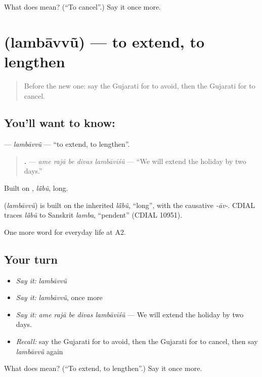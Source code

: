 \begin{tcolorbox}[breakable,colback=teal!4,colframe=teal!35!black,title={Before you move on}]
What does   mean? (\textquotedblleft{}To cancel\textquotedblright{}.) Say it once more.
\end{tcolorbox}
\section[\texorpdfstring{\gu{લંબાવવું} (lambāvvũ)}{લંબાવવું (lambāvvũ)}]{ (lambāvvũ) — to extend, to lengthen}

\label{lesson:GU-C181-lambavvu}



\begin{quote}
Before the new one: say the Gujarati for to avoid, then the Gujarati for to cancel.
\end{quote}

\subsection*{You'll want to know: }
\textbf{} — \emph{lambāvvũ} — \textquotedblleft{}to extend, to lengthen\textquotedblright{}.

\begin{quote}
\textbf{    .} — \emph{ame rajā be divas lambāvīśũ} — \textquotedblleft{}We will extend the holiday by two days.\textquotedblright{}
\end{quote}

Built on \textbf{}, \emph{lā̃bũ}, long.

\begin{cousinweb}
\textbf{} (\emph{lambāvvũ}) is built on the inherited \emph{lā̃bũ}, \textquotedblleft{}long\textquotedblright{}, with the causative \emph{-āv-}. CDIAL traces \emph{lā̃bũ} to Sanskrit \emph{lamba}, \textquotedblleft{}pendent\textquotedblright{} (CDIAL 10951).
\end{cousinweb}

\begin{grammarlens}[title={What you've built}]
One more word for everyday life at A2.
\end{grammarlens}

\subsection*{Your turn}
\begin{itemize}
\raggedright
  \item \emph{Say it:} \emph{lambāvvũ}
  \item \emph{Say it:} \emph{lambāvvũ}, once more
  \item \emph{Say it:} \emph{ame rajā be divas lambāvīśũ} — We will extend the holiday by two days.
  \item \emph{Recall:} say the Gujarati for to avoid, then the Gujarati for to cancel, then say \emph{lambāvvũ} again
\end{itemize}

\begin{tcolorbox}[breakable,colback=teal!4,colframe=teal!35!black,title={Before you move on}]
What does  mean? (\textquotedblleft{}To extend, to lengthen\textquotedblright{}.) Say it once more.
\end{tcolorbox}
